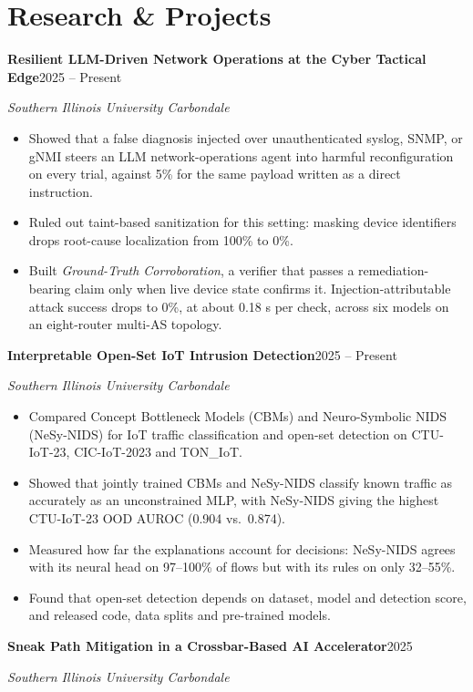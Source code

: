 \documentclass[10.5pt,letterpaper]{article}
\newcommand{\entry}[2]{\textbf{#1}\hfill #2\par\nopagebreak}
\newcommand{\subentry}[2]{\textit{#1}\hfill \textit{#2}\par\nopagebreak\vspace{0.15em}\nopagebreak}
\begin{document}
\section*{Research \& Projects}
\entry{Resilient LLM-Driven Network Operations at the Cyber Tactical Edge}{2025 -- Present}
\subentry{Southern Illinois University Carbondale}{}
\begin{itemize}
  \item Showed that a false diagnosis injected over unauthenticated syslog, SNMP, or gNMI steers an
        LLM network-operations agent into harmful reconfiguration on every trial, against 5\% for the
        same payload written as a direct instruction.
  \item Ruled out taint-based sanitization for this setting: masking device identifiers drops
        root-cause localization from 100\% to 0\%.
  \item Built \textit{Ground-Truth Corroboration}, a verifier that passes a remediation-bearing claim
        only when live device state confirms it. Injection-attributable attack success drops to 0\%,
        at about 0.18 s per check, across six models on an eight-router multi-AS topology.
\end{itemize}
\vspace{0.25em}
\entry{Interpretable Open-Set IoT Intrusion Detection}{2025 -- Present}
\subentry{Southern Illinois University Carbondale}{}
\begin{itemize}
  \item Compared Concept Bottleneck Models (CBMs) and Neuro-Symbolic NIDS (NeSy-NIDS) for IoT
        traffic classification and open-set detection on CTU-IoT-23, CIC-IoT-2023 and TON\_IoT.
  \item Showed that jointly trained CBMs and NeSy-NIDS classify known traffic as accurately as an
        unconstrained MLP, with NeSy-NIDS giving the highest CTU-IoT-23 OOD AUROC (0.904 vs.\ 0.874).
  \item Measured how far the explanations account for decisions: NeSy-NIDS agrees with its neural
        head on 97--100\% of flows but with its rules on only 32--55\%.
  \item Found that open-set detection depends on dataset, model and detection score, and released
        code, data splits and pre-trained models.
\end{itemize}
\vspace{0.25em}
\entry{Sneak Path Mitigation in a Crossbar-Based AI Accelerator}{2025}
\subentry{Southern Illinois University Carbondale}{}
\end{document}
